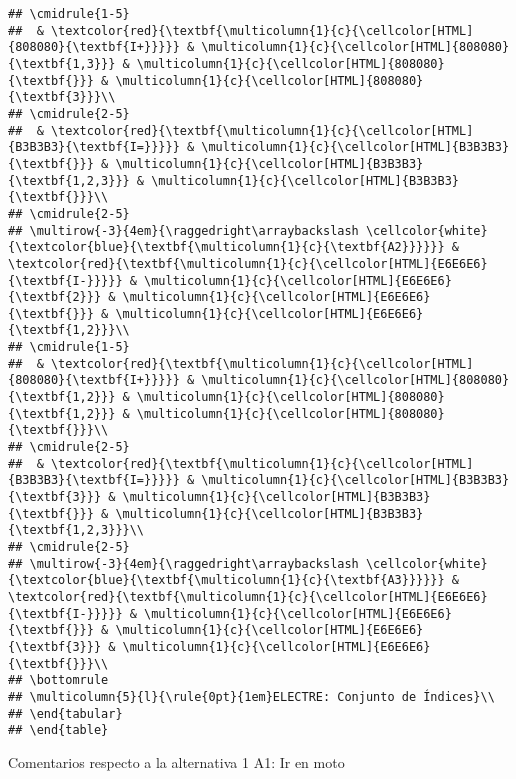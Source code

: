 \documentclass[
]{article}
\begin{document}
\begin{verbatim}
## \cmidrule{1-5}
##  & \textcolor{red}{\textbf{\multicolumn{1}{c}{\cellcolor[HTML]{808080}{\textbf{I+}}}}} & \multicolumn{1}{c}{\cellcolor[HTML]{808080}{\textbf{1,3}}} & \multicolumn{1}{c}{\cellcolor[HTML]{808080}{\textbf{}}} & \multicolumn{1}{c}{\cellcolor[HTML]{808080}{\textbf{3}}}\\
## \cmidrule{2-5}
##  & \textcolor{red}{\textbf{\multicolumn{1}{c}{\cellcolor[HTML]{B3B3B3}{\textbf{I=}}}}} & \multicolumn{1}{c}{\cellcolor[HTML]{B3B3B3}{\textbf{}}} & \multicolumn{1}{c}{\cellcolor[HTML]{B3B3B3}{\textbf{1,2,3}}} & \multicolumn{1}{c}{\cellcolor[HTML]{B3B3B3}{\textbf{}}}\\
## \cmidrule{2-5}
## \multirow{-3}{4em}{\raggedright\arraybackslash \cellcolor{white}{\textcolor{blue}{\textbf{\multicolumn{1}{c}{\textbf{A2}}}}}} & \textcolor{red}{\textbf{\multicolumn{1}{c}{\cellcolor[HTML]{E6E6E6}{\textbf{I-}}}}} & \multicolumn{1}{c}{\cellcolor[HTML]{E6E6E6}{\textbf{2}}} & \multicolumn{1}{c}{\cellcolor[HTML]{E6E6E6}{\textbf{}}} & \multicolumn{1}{c}{\cellcolor[HTML]{E6E6E6}{\textbf{1,2}}}\\
## \cmidrule{1-5}
##  & \textcolor{red}{\textbf{\multicolumn{1}{c}{\cellcolor[HTML]{808080}{\textbf{I+}}}}} & \multicolumn{1}{c}{\cellcolor[HTML]{808080}{\textbf{1,2}}} & \multicolumn{1}{c}{\cellcolor[HTML]{808080}{\textbf{1,2}}} & \multicolumn{1}{c}{\cellcolor[HTML]{808080}{\textbf{}}}\\
## \cmidrule{2-5}
##  & \textcolor{red}{\textbf{\multicolumn{1}{c}{\cellcolor[HTML]{B3B3B3}{\textbf{I=}}}}} & \multicolumn{1}{c}{\cellcolor[HTML]{B3B3B3}{\textbf{3}}} & \multicolumn{1}{c}{\cellcolor[HTML]{B3B3B3}{\textbf{}}} & \multicolumn{1}{c}{\cellcolor[HTML]{B3B3B3}{\textbf{1,2,3}}}\\
## \cmidrule{2-5}
## \multirow{-3}{4em}{\raggedright\arraybackslash \cellcolor{white}{\textcolor{blue}{\textbf{\multicolumn{1}{c}{\textbf{A3}}}}}} & \textcolor{red}{\textbf{\multicolumn{1}{c}{\cellcolor[HTML]{E6E6E6}{\textbf{I-}}}}} & \multicolumn{1}{c}{\cellcolor[HTML]{E6E6E6}{\textbf{}}} & \multicolumn{1}{c}{\cellcolor[HTML]{E6E6E6}{\textbf{3}}} & \multicolumn{1}{c}{\cellcolor[HTML]{E6E6E6}{\textbf{}}}\\
## \bottomrule
## \multicolumn{5}{l}{\rule{0pt}{1em}ELECTRE: Conjunto de Índices}\\
## \end{tabular}
## \end{table}
\end{verbatim}

Comentarios respecto a la alternativa 1 A1: Ir en moto
\end{document}
